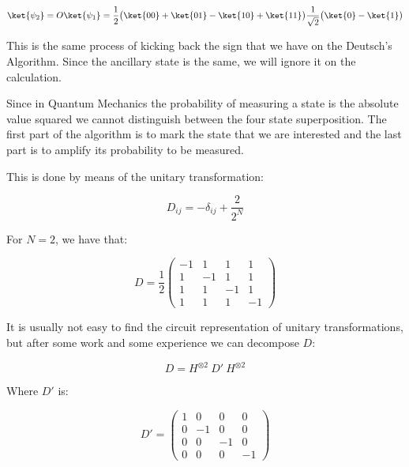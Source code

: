 \begin{equation}
   \ket{\psi_2} = O \ket{\psi_1} = \frac{1}{2} \big(  \ket{00} + \ket{01} - \ket{10} + \ket{11} \big) \frac{1}{\sqrt{2}} \big( \ket{0} - \ket{1} \big)
\end{equation}

This is the same process of kicking back the sign that we have on the Deutsch's Algorithm. Since the ancillary state is the same, we will ignore it on the calculation.

Since in Quantum Mechanics the probability of measuring a state is the absolute value squared we cannot distinguish between the four state superposition. The first part of the algorithm is to mark the state that we are interested and the last part is to amplify its probability to be measured.

This is done by means of the unitary transformation:

\begin{equation}
    D_{ij} = - \delta_{ij} + \frac{2}{2^N}
\end{equation}

For $N=2$, we have that:

\begin{equation}
    D = \frac{1}{2} \begin{pmatrix}
    -1 & 1 & 1 & 1 \\
    1 & -1 & 1 & 1 \\
    1 & 1 & -1 & 1 \\
    1 & 1 & 1 & -1
    \end{pmatrix}
\end{equation}

It is usually not easy to find the circuit representation of unitary transformations, but after some work and some experience we can decompose $D$:

\begin{equation}
D = H^{\otimes2} \ D' \ H^{\otimes2}
\end{equation}

Where $D'$ is:

\begin{equation}
    D' = \begin{pmatrix}
    1 &  0  & 0 & 0 \\
    0 & -1  & 0 & 0 \\
    0 &  0 & -1 & 0 \\
    0 &  0 & 0 & -1
    \end{pmatrix}
\end{equation}

